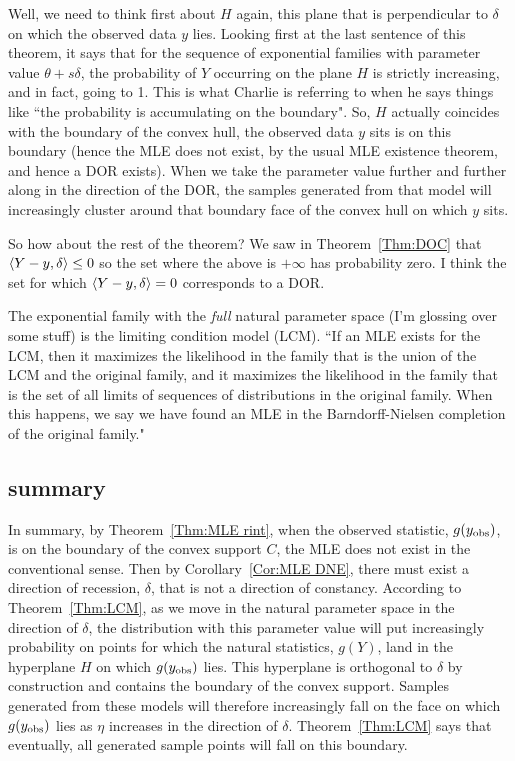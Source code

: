 Well, we need to think first about $H$ again, this plane that is perpendicular to $
\delta$ on which the observed data $y$ lies.  Looking first at the last sentence of 
this theorem, it says that for the sequence of exponential families with parameter 
value $\theta+s\delta$, the probability of $Y$ occurring on the plane $H$ is strictly 
increasing, and in fact, going to 1.  This is what Charlie is referring to when he 
says things like ``the probability is accumulating on the boundary".  So, $H$ 
actually coincides with the boundary of the convex hull, the observed data $y$ sits 
is on this boundary (hence the MLE does not exist, by the usual MLE existence 
theorem, and hence a DOR exists).  When we take the parameter value further and 
further along in the direction of the DOR, the samples generated from that model will 
increasingly cluster around that boundary face of the convex hull on which $y$ 
sits.

So how about the rest of the theorem?  We saw in Theorem~\ref{Thm:DOC} that $\langle Y-y,\delta \rangle 
\leq 0$ so the set where the above is $+\infty$ has probability zero.  I think the 
set for which $\langle Y-y,\delta \rangle = 0$ corresponds to a DOR.

The exponential family with the \emph{full} natural parameter space (I'm 
glossing over some stuff) is the limiting condition model (LCM).  ``If an MLE exists 
for the LCM, then it maximizes the likelihood in the family that is the union of the 
LCM and the original family, and it maximizes the likelihood in the family that is 
the set of all limits of sequences of distributions in the original family.  When 
this happens, we say we have found an MLE in the Barndorff-Nielsen completion of the 
original family."



\subsection{summary}



In summary, by Theorem~\ref{Thm:MLE rint}, when the observed statistic, $g(y_{\textrm{obs}})$, is 
on the boundary of the convex support $C$, the MLE does not exist in the conventional 
sense.
Then by Corollary~\ref{Cor:MLE DNE}, there must exist a direction of recession, $
\delta$, that is not a direction of constancy.  
According to Theorem~\ref{Thm:LCM}, as we move in the natural parameter space in the 
direction of $\delta$, the distribution with this parameter value will put 
increasingly probability on points for which the natural statistics, $g(Y)$, land in 
the hyperplane $H$ on which $g(y_{\textrm{obs}})$ lies.  This hyperplane is orthogonal to $\delta
$ by construction and contains the boundary of the convex support.  Samples generated 
from these models will therefore increasingly fall on the face on which $g(y_{\textrm{obs}})$ 
lies as $\eta$ increases in the direction of $\delta$.  Theorem~\ref{Thm:LCM} says 
that eventually, all generated sample points will fall on this boundary.


